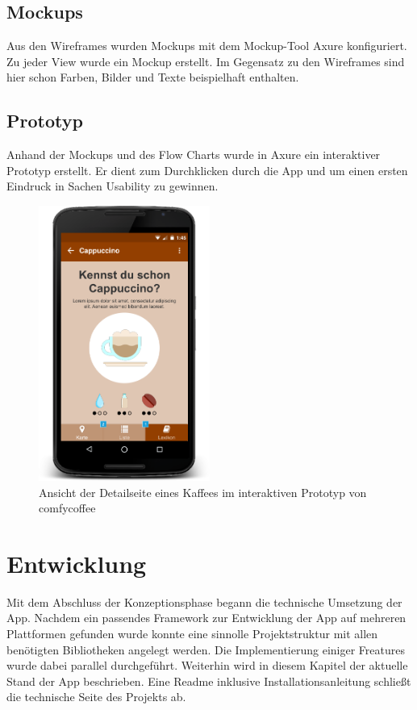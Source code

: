 \section{Mockups}
Aus den Wireframes wurden Mockups mit dem Mockup-Tool Axure konfiguriert. Zu jeder View wurde ein Mockup erstellt. Im Gegensatz zu den Wireframes sind hier schon Farben, Bilder und Texte beispielhaft enthalten.

\section{Prototyp}
Anhand der Mockups und des Flow Charts wurde in Axure ein interaktiver Prototyp erstellt. Er dient zum Durchklicken durch die App und um einen ersten Eindruck in Sachen Usability zu gewinnen.

\begin{figure}[h!]
    \centering
		\includegraphics[width=0.5\textwidth]{Bilder/detail.png}
		\caption{Ansicht der Detailseite eines Kaffees im interaktiven Prototyp von comfycoffee}
\end{figure}


\chapter{Entwicklung}
\label{entwicklung}
Mit dem Abschluss der Konzeptionsphase begann die technische Umsetzung der App.
Nachdem ein passendes Framework zur Entwicklung der App auf mehreren Plattformen gefunden wurde konnte eine sinnolle Projektstruktur mit allen benötigten Bibliotheken angelegt werden.
Die Implementierung einiger Freatures wurde dabei parallel durchgeführt.
Weiterhin wird in diesem Kapitel der aktuelle Stand der App beschrieben.
Eine Readme inklusive Installationsanleitung schließt die technische Seite des Projekts ab.



